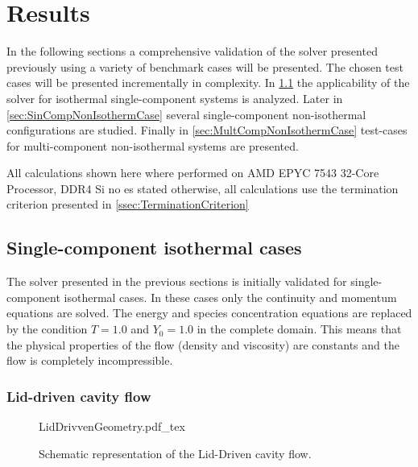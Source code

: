 \chapter{Results}	\label{ch:results}
\glsresetall
In the following sections a comprehensive validation of the solver presented previously using a variety of benchmark cases will be presented. The chosen test cases will be presented incrementally in complexity. In \cref{sec:SingleCompIsotCase} the applicability of the solver for isothermal single-component systems is analyzed. Later in \cref{sec:SinCompNonIsothermCase} several single-component non-isothermal configurations are studied. Finally in \cref{sec:MultCompNonIsothermCase} test-cases for multi-component non-isothermal systems are presented. 



All calculations shown here where performed on AMD EPYC 7543 32-Core Processor, DDR4 %
Si no es stated otherwise, all calculations use the termination criterion presented in \cref{ssec:TerminationCriterion}



\section{Single-component isothermal cases}\label{sec:SingleCompIsotCase}
The solver presented in the previous sections is initially validated for single-component isothermal cases. In these cases only the continuity and momentum equations are solved. The energy and species concentration equations  are replaced by the condition $T = 1.0$ and $Y_0 = 1.0$ in the complete domain. This means that the physical properties of the flow (density and viscosity) are constants and the flow is completely incompressible.

\subsection{Lid-driven cavity flow}
\begin{figure}[b]
	\begin{center}
		\def\svgwidth{0.3\textwidth}
		{LidDrivvenGeometry.pdf_tex}		
		\caption{Schematic representation of the Lid-Driven cavity flow.}
		\label{fig:LidDrivenCavity}
	\end{center}	
\end{figure} 

